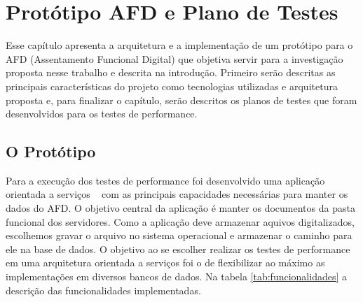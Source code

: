 \chapter{Protótipo AFD e Plano de Testes}

Esse capítulo apresenta a arquitetura e a implementação de um protótipo para o AFD (Assentamento Funcional Digital) que objetiva servir para a investigação proposta nesse trabalho e descrita na introdução. Primeiro serão descritas as principais características do projeto como tecnologias utilizadas e arquitetura proposta e,  para finalizar o capítulo, serão descritos os planos de testes que foram desenvolvidos para os testes de performance.

\section{O Protótipo}

Para a execução dos testes de performance foi desenvolvido uma aplicação orientada a serviços ~\cite{erl:2007} com as principais capacidades necessárias para manter os dados do AFD. O objetivo central da aplicação é manter os documentos da pasta funcional dos servidores. Como a aplicação deve armazenar aquivos digitalizados, escolhemos gravar o arquivo no sistema operacional e armazenar o caminho para ele na base de dados. O objetivo ao se escolher realizar os testes de performance em uma arquitetura orientada a serviços foi o de flexibilizar ao máximo as implementações em diversos bancos de dados. Na tabela \ref{tab:funcionalidades} a descrição das funcionalidades implementadas.

\renewcommand{\arraystretch}{3}

